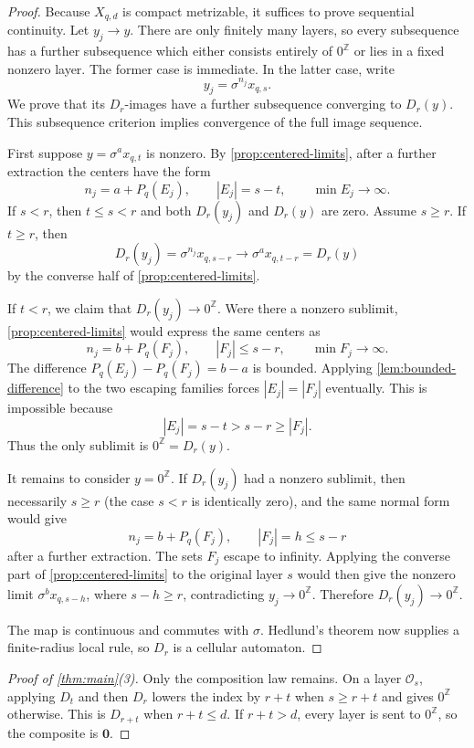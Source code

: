 \documentclass[11pt,a4paper]{amsart}
\theoremstyle{definition}
\theoremstyle{remark}
\newcommand{\Z}{\mathbb Z}
\newcommand{\cO}{\mathcal O}
\newcommand{\zz}{\mathbf 0}
\newcommand{\zero}{0^{\Z}}
\newcommand{\pq}{P_q}
\begin{document}
\begin{proof}
Because $X_{q,d}$ is compact metrizable, it suffices to prove sequential
continuity.  Let $y_j\to y$.  There are only finitely many layers, so every
subsequence has a further subsequence which either consists entirely of
$\zero$ or lies in a fixed nonzero layer.  The former case is immediate.  In
the latter case, write
\[
 y_j=\sigma^{n_j}x_{q,s}.
\]
We prove that its $D_r$-images have a further subsequence converging to
$D_r(y)$.  This subsequence criterion implies convergence of the full image
sequence.

First suppose $y=\sigma^a x_{q,t}$ is nonzero.  By
\cref{prop:centered-limits}, after a further extraction the centers have
the form
\[
 n_j=a+\pq(E_j),
 \qquad |E_j|=s-t,
 \qquad \min E_j\to\infty.
\]
If $s<r$, then $t\leq s<r$ and both $D_r(y_j)$ and $D_r(y)$ are zero.  Assume
$s\geq r$.  If $t\geq r$, then
\[
 D_r(y_j)=\sigma^{n_j}x_{q,s-r}
 \longrightarrow \sigma^a x_{q,t-r}=D_r(y)
\]
by the converse half of \cref{prop:centered-limits}.

If $t<r$, we claim that $D_r(y_j)\to\zero$.  Were there a nonzero sublimit,
\cref{prop:centered-limits} would express the same centers as
\[
 n_j=b+\pq(F_j),
 \qquad |F_j|\leq s-r,
 \qquad \min F_j\to\infty.
\]
The difference $\pq(E_j)-\pq(F_j)=b-a$ is bounded.  Applying
\cref{lem:bounded-difference} to the two escaping families forces
$|E_j|=|F_j|$ eventually.  This is impossible because
\[
 |E_j|=s-t>s-r\geq|F_j|.
\]
Thus the only sublimit is $\zero=D_r(y)$.

It remains to consider $y=\zero$.  If $D_r(y_j)$ had a nonzero sublimit,
then necessarily $s\geq r$ (the case $s<r$ is identically zero), and
the same normal form would give
\[
 n_j=b+\pq(F_j),
 \qquad |F_j|=h\leq s-r
\]
after a further extraction.  The sets $F_j$ escape to infinity.
Applying the converse part of \cref{prop:centered-limits} to the original
layer $s$ would then give the nonzero limit
$\sigma^b x_{q,s-h}$, where $s-h\geq r$, contradicting
$y_j\to\zero$.  Therefore $D_r(y_j)\to\zero$.

The map is continuous and commutes with $\sigma$.  Hedlund's theorem now
supplies a finite-radius local rule, so $D_r$ is a cellular automaton.
\end{proof}

\begin{proof}[Proof of \cref{thm:main}(3)]
Only the composition law remains.  On a layer $\cO_s$, applying $D_t$ and
then $D_r$ lowers the index by $r+t$ when $s\geq r+t$ and gives $\zero$
otherwise.  This is $D_{r+t}$ when $r+t\leq d$.  If $r+t>d$, every layer is
sent to $\zero$, so the composite is $\zz$.
\end{proof}
\end{document}
